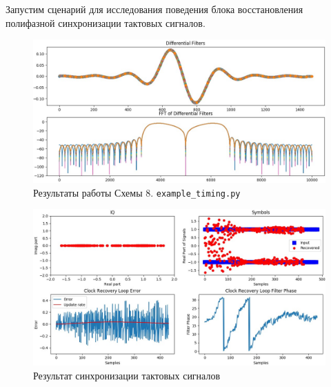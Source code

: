 \documentclass[a4paper, 12pt]{report}
\begin{document}
	Запустим сценарий для исследования поведения блока восстановления полифазной синхронизации тактовых сигналов.
	\begin{figure}[H]
		\centering
		\includegraphics[width=1.0\textwidth]{19.jpg}
		\caption{Результаты работы Схемы 8. \texttt{example\_timing.py}}
		\label{fig:19}
	\end{figure}
	\begin{figure}[H]
		\centering
		\includegraphics[width=1.0\textwidth]{20.jpg}
		\caption{Результат синхронизации тактовых сигналов}
		\label{fig:20}
	\end{figure}
	
\end{document}
